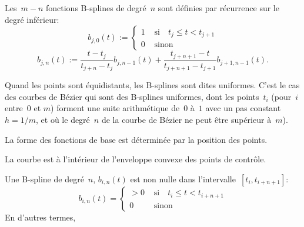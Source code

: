 \medskip
Les~$m-n$ fonctions B-splines de degré~$n$ sont définies par récurrence sur le degré inférieur:
\begin{equation}
  b_{j, 0}(t):= \left\{ \begin{matrix} 1 & \text{ si} \quad t_j \leqslant t < t_{j + 1} \\ 0 & \text{ sinon} \end{matrix} \right. 
\end{equation}
\begin{equation}
  b_{j, n}(t):= \frac{t - t_j}{t_{j + n} - t_j} b_{j, n - 1}(t) + \frac{t_{j + n + 1} - t}{t_{j + n + 1} - t_{j + 1}} b_{j + 1, n - 1}(t).
\end{equation}

Quand les points sont équidistants, les B-splines sont dites uniformes.
C'est le cas des courbes de Bézier qui sont des B-splines uniformes, dont les points~$t_i$ (pour~$i$ entre~$0$ et 
$m$) forment une suite arithmétique de~$0$ à~$1$ avec un pas constant~$h=1/m$, et où le degré~$n$ 
de la courbe de Bézier ne peut être supérieur à~$m$).

\medskip
{}

\medskip
La forme des fonctions de base est déterminée par la position des points.

La courbe est à l'intérieur de l'enveloppe convexe des points de contrôle.

Une B-spline de degré~$n$, $b_{i,n}(t)$ est non nulle dans l'intervalle~$[t_i, t_{i+n+1}]$:
\begin{equation}
  b_{i,n}(t) = \left\{\begin{matrix} >0 & \text{ si} \quad t_{i} \leqslant t < t_{i+n+1} \\ 0 & \text{ sinon} \end{matrix} \right. 
\end{equation}
En d'autres termes, 

